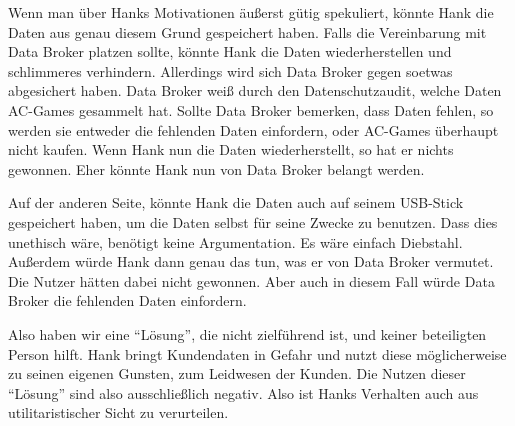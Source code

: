 Wenn man über Hanks Motivationen äußerst gütig spekuliert, könnte Hank die Daten aus genau diesem Grund gespeichert haben.
Falls die Vereinbarung mit Data Broker platzen sollte, könnte Hank die Daten wiederherstellen und schlimmeres verhindern.
Allerdings wird sich Data Broker gegen soetwas abgesichert haben.
Data Broker weiß durch den Datenschutzaudit, welche Daten AC-Games gesammelt hat.
Sollte Data Broker bemerken, dass Daten fehlen, so werden sie entweder die fehlenden Daten einfordern, oder AC-Games überhaupt nicht kaufen.
Wenn Hank nun die Daten wiederherstellt, so hat er nichts gewonnen.
Eher könnte Hank nun von Data Broker belangt werden.

Auf der anderen Seite, könnte Hank die Daten auch auf seinem USB-Stick gespeichert haben, um die Daten selbst für seine Zwecke zu benutzen.
Dass dies unethisch wäre, benötigt keine Argumentation. Es wäre einfach Diebstahl.
Außerdem würde Hank dann genau das tun, was er von Data Broker vermutet.
Die Nutzer hätten dabei nicht gewonnen.
Aber auch in diesem Fall würde Data Broker die fehlenden Daten einfordern.

Also haben wir eine \enquote{Lösung}, die nicht zielführend ist, und keiner beteiligten Person hilft. Hank bringt Kundendaten in Gefahr und nutzt diese möglicherweise zu seinen eigenen Gunsten, zum Leidwesen der Kunden.
Die Nutzen dieser \enquote{Lösung} sind also ausschließlich negativ. Also ist Hanks Verhalten auch aus utilitaristischer Sicht zu verurteilen.



